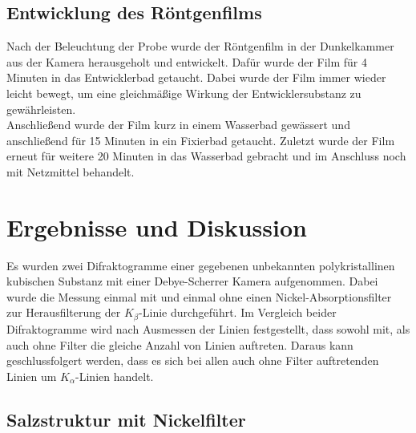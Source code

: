 \documentclass[a4paper,twoside,final]{article}
\begin{document}
\subsection{Entwicklung des Röntgenfilms}
Nach der Beleuchtung der Probe wurde der Röntgenfilm in der Dunkelkammer aus der Kamera herausgeholt und entwickelt. Dafür wurde der Film für 4 Minuten in das Entwicklerbad getaucht. Dabei wurde der Film immer wieder leicht bewegt, um eine gleichmäßige Wirkung der Entwicklersubstanz zu gewährleisten.\\
Anschließend wurde der Film kurz in einem Wasserbad gewässert und anschließend für 15 Minuten in ein Fixierbad getaucht. Zuletzt wurde der Film erneut für weitere 20 Minuten in das Wasserbad gebracht und im Anschluss noch mit Netzmittel behandelt.


\newpage
\section{Ergebnisse und Diskussion}
Es wurden zwei Difraktogramme einer gegebenen unbekannten polykristallinen kubischen Substanz mit einer Debye-Scherrer Kamera aufgenommen. Dabei wurde die Messung einmal mit und einmal ohne einen Nickel-Absorptionsfilter zur Herausfilterung der $K_{\beta}$-Linie durchgeführt. Im Vergleich beider Difraktogramme wird nach Ausmessen der Linien festgestellt, dass sowohl mit, als auch ohne Filter die gleiche Anzahl von Linien auftreten. Daraus kann geschlussfolgert werden, dass es sich bei allen auch ohne Filter auftretenden Linien um $K_{\alpha}$-Linien handelt.
\subsection{Salzstruktur mit Nickelfilter}
\end{document}
